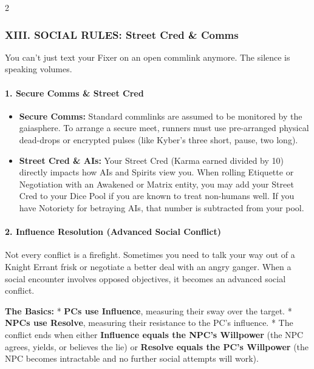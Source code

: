 \documentclass[
  oneside]{article}
\providecommand{\tightlist}{%
  \setlength{\itemsep}{0pt}\setlength{\parskip}{0pt}}
\begin{document}
\begin{multicols}{2}
\hypertarget{xiii.-social-rules-street-cred-comms}{%
\subsubsection{XIII. SOCIAL RULES: Street Cred \&
Comms}\label{xiii.-social-rules-street-cred-comms}}

You can't just text your Fixer on an open commlink
anymore. The silence is speaking volumes.

\hypertarget{secure-comms-street-cred}{%
\paragraph{1. Secure Comms \& Street
Cred}\label{secure-comms-street-cred}}

\begin{itemize}
\tightlist
\item
  \textbf{Secure Comms:} Standard commlinks are
  assumed to be monitored by the gaiasphere. To
  arrange a secure meet, runners must use
  pre-arranged physical dead-drops or encrypted
  pulses (like Kyber's three short, pause, two
  long).
\item
  \textbf{Street Cred \& AIs:} Your Street Cred
  (Karma earned divided by 10) directly impacts
  how AIs and Spirits view you. When rolling
  Etiquette or Negotiation with an Awakened or
  Matrix entity, you may add your Street Cred to
  your Dice Pool if you are known to treat
  non-humans well. If you have Notoriety for
  betraying AIs, that number is subtracted from
  your pool.
\end{itemize}

\hypertarget{influence-resolution-advanced-social-conflict}{%
\paragraph{2. Influence Resolution (Advanced
Social
Conflict)}\label{influence-resolution-advanced-social-conflict}}

Not every conflict is a firefight. Sometimes you
need to talk your way out of a Knight Errant frisk
or negotiate a better deal with an angry ganger.
When a social encounter involves opposed
objectives, it becomes an advanced social
conflict.

\textbf{The Basics:} * \textbf{PCs use Influence},
measuring their sway over the target. *
\textbf{NPCs use Resolve}, measuring their
resistance to the PC's influence. * The conflict
ends when either \textbf{Influence equals the
NPC's Willpower} (the NPC agrees, yields, or
believes the lie) or \textbf{Resolve equals the
PC's Willpower} (the NPC becomes intractable and
no further social attempts will work).


\end{multicols}
\end{document}
